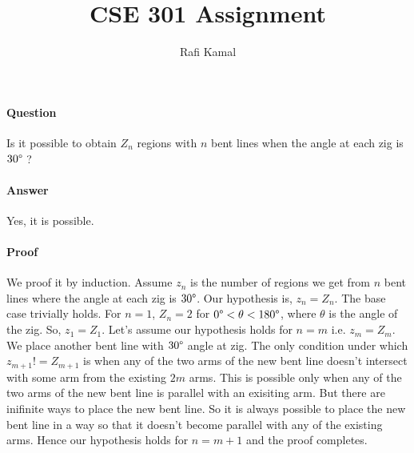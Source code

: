 \documentclass{article}
\title{CSE 301 Assignment}
\author{Rafi Kamal}
\date{}
\begin{document}
\maketitle

\paragraph{Question}
Is it possible to obtain $Z_n$ regions with $n$ bent lines when the angle at
each zig is $30\degree$ ?

\paragraph{Answer}
Yes, it is possible. 

\paragraph{Proof}
We proof it by induction. Assume $z_n$ is the number of regions we get from $n$ bent lines where the angle at each zig is $30\degree$. Our hypothesis is, $z_n = Z_n$.\newline
The base case trivially holds. For $n = 1$, $Z_n = 2$ for $0\degree < \theta < 180\degree$, where $\theta$ is the angle of the zig. So, $z_1 = Z_1$.\newline
Let's assume our hypothesis holds for $n = m$ i.e. $z_m = Z_m$. We place another bent line with $30\degree$ angle at zig. The only condition under which $z_{m+1} != Z_{m+1}$ is when any of the two arms of the new bent line doesn't intersect with some arm from the existing $2m$ arms. This is possible only when any of the two arms of the new bent line is parallel with an exisiting arm. But there are inifinite ways to place the new bent line. So it is always possible to place the new bent line in a way so that it doesn't become parallel with any of the existing arms. Hence our hypothesis holds for $n = m + 1$ and the proof completes.
\end{document}
